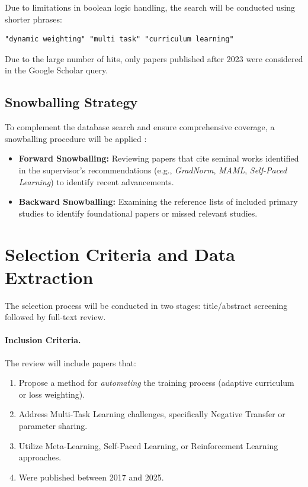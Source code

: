 Due to limitations in boolean logic handling, the search will be conducted
using shorter phrases:
\begin{verbatim}
"dynamic weighting" "multi task" "curriculum learning"
\end{verbatim}
Due to the large number of hits, only papers published after 2023 were
considered in the Google Scholar query.

\subsection{Snowballing Strategy}

To complement the database search and ensure comprehensive coverage, a
snowballing procedure will be applied \cite{wohlin2014guidelines}:
\begin{itemize}
	\item \textbf{Forward Snowballing:} Reviewing papers that cite seminal works identified in the supervisor's recommendations (e.g., \emph{GradNorm}, \emph{MAML}, \emph{Self-Paced Learning}) to identify recent advancements.
	\item \textbf{Backward Snowballing:} Examining the reference lists of included primary studies to identify foundational papers or missed relevant studies.
\end{itemize}

\section{Selection Criteria and Data Extraction}

The selection process will be conducted in two stages: title/abstract screening
followed by full-text review.

\begin{figure}[t]
	\centering
	\resizebox{0.95\textwidth}{!}{
		
	}
	\label{rys:prisma}
\end{figure}

\paragraph{Inclusion Criteria.} The review will include papers that:
\begin{enumerate}
	\item Propose a method for \emph{automating} the training process (adaptive
	      curriculum or loss weighting).
	\item Address Multi-Task Learning challenges, specifically Negative Transfer or
	      parameter sharing.
	\item Utilize Meta-Learning, Self-Paced Learning, or Reinforcement Learning
	      approaches.
	\item Were published between 2017 and 2025.
\end{enumerate}

